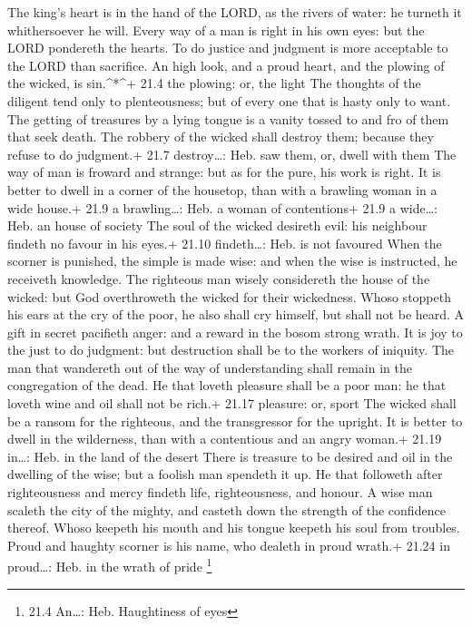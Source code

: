  The king's heart is in the hand of the LORD, as the rivers
of water: he turneth it whithersoever he will.  Every way of
a man is right in his own eyes: but the LORD pondereth the hearts.
 To do justice and judgment is more acceptable to the LORD
than sacrifice.  An high look, and a proud heart, and the
plowing of the wicked, is sin.\^{}*\^{}+ 21.4 the plowing: or, the light
 The thoughts of the diligent tend only to plenteousness;
but of every one that is hasty only to want.  The getting of
treasures by a lying tongue is a vanity tossed to and fro of them that
seek death.  The robbery of the wicked shall destroy them;
because they refuse to do judgment.+ 21.7 destroy\ldots: Heb. saw them,
or, dwell with them  The way of man is froward and strange:
but as for the pure, his work is right.  It is better to
dwell in a corner of the housetop, than with a brawling woman in a wide
house.+ 21.9 a brawling\ldots: Heb. a woman of contentions+ 21.9 a
wide\ldots: Heb. an house of society  The soul of the
wicked desireth evil: his neighbour findeth no favour in his eyes.+
21.10 findeth\ldots: Heb. is not favoured  When the scorner
is punished, the simple is made wise: and when the wise is instructed,
he receiveth knowledge.  The righteous man wisely
considereth the house of the wicked: but God overthroweth the wicked for
their wickedness.  Whoso stoppeth his ears at the cry of
the poor, he also shall cry himself, but shall not be heard.
 A gift in secret pacifieth anger: and a reward in the
bosom strong wrath.  It is joy to the just to do judgment:
but destruction shall be to the workers of iniquity.  The
man that wandereth out of the way of understanding shall remain in the
congregation of the dead.  He that loveth pleasure shall be
a poor man: he that loveth wine and oil shall not be rich.+ 21.17
pleasure: or, sport  The wicked shall be a ransom for the
righteous, and the transgressor for the upright.  It is
better to dwell in the wilderness, than with a contentious and an angry
woman.+ 21.19 in\ldots: Heb. in the land of the desert 
There is treasure to be desired and oil in the dwelling of the wise; but
a foolish man spendeth it up.  He that followeth after
righteousness and mercy findeth life, righteousness, and honour.
 A wise man scaleth the city of the mighty, and casteth
down the strength of the confidence thereof.  Whoso keepeth
his mouth and his tongue keepeth his soul from troubles. 
Proud and haughty scorner is his name, who dealeth in proud wrath.+
21.24 in proud\ldots: Heb. in the wrath of pride \footnote{21.4
  An\ldots: Heb. Haughtiness of eyes}

